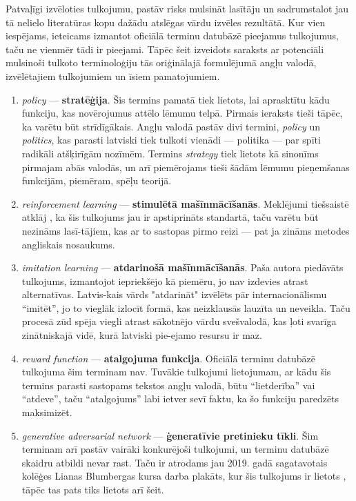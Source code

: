 \documentclass[12pt, a4paper]{article}
\numberwithin{equation}{section} %
\begin{document}
Patvaļīgi izvēloties tulkojumu, pastāv risks mulsināt lasītāju un sadrumstalot jau tā nelielo literatūras kopu dažādu atslēgas vārdu izvēles rezultātā. Kur vien iespējams, ieteicams izmantot oficiālā terminu datubāzē pieejamus tulkojumus, taču ne vienmēr tādi ir pieejami. Tāpēc šeit izveidots saraksts ar potenciāli mulsinoši tulkoto terminoloģiju tās oriģinālajā formulējumā angļu valodā, izvēlētajiem tulkojumiem un īsiem pamatojumiem.  

\begin{enumerate}
    \item \textit{policy} --- \textbf{stratēģija}. Šis termins pamatā tiek lietots, lai aprasktītu kādu funkciju, kas novērojumus attēlo lēmumu telpā. Pirmais ieraksts tieši tāpēc, ka varētu būt strīdīgākais. Angļu valodā pastāv divi termini, \textit{policy} un \textit{politics}, kas parasti latviski tiek tulkoti vienādi --- politika --- par spīti radikāli atšķirīgām nozīmēm. Termins \textit{strategy} tiek lietots kā sinonīms pirmajam abās valodās, un arī piemērojams tieši šādām lēmumu pieņemšanas funkcijām, piemēram, spēļu teorijā.
    \item \textit{reinforcement learning} --- \textbf{stimulētā mašīnmācīšanās}. Meklējumi tiešsaistē atklāj \cite{enc_stim}, ka šis tulkojums jau ir apstiprināts standartā, taču varētu būt nezināms lasī-tājiem, kas ar to sastopas pirmo reizi --- pat ja zināms metodes angliskais nosaukums.
    \item \textit{imitation learning} --- \textbf{atdarinošā mašīnmācīšanās}. Paša autora piedāvāts tulkojums, izmantojot iepriekšējo kā piemēru, jo nav izdevies atrast alternatīvas. Latvis-kais vārds "atdarināt" izvēlēts pār internacionālismu ``imitēt'', jo to vieglāk izlocīt formā, kas neizklausās lauzīta un neveikla. Taču procesā zūd spēja viegli atrast sākotnējo vārdu svešvalodā, kas ļoti svarīga zinātniskajā vidē, kurā latviski pie-ejamo resursu ir maz.
    \item \textit{reward function} --- \textbf{atalgojuma funkcija}. Oficiālā terminu datubāzē tulkojuma šim terminam nav. Tuvākie tulkojumi lietojumam, ar kādu šis termins parasti sastopams tekstos angļu valodā, būtu ``lietderība'' vai ``atdeve'', taču ``atalgojums'' labi ietver sevī faktu, ka šo funkciju paredzēts maksimizēt.
    \item \textit{generative adversarial network} --- \textbf{ģeneratīvie pretinieku tīkli}. Šim terminam arī pastāv vairāki konkurējoši tulkojumi, un terminu datubāzē skaidru atbildi nevar rast. Taču ir atrodams jau 2019. gadā sagatavotais kolēģes Lianas Blumbergas kursa darba plakāts, kur šis tulkojums ir lietots \cite{GAN}, tāpēc tas pats tiks lietots arī šeit.
\end{enumerate}
\end{document}
